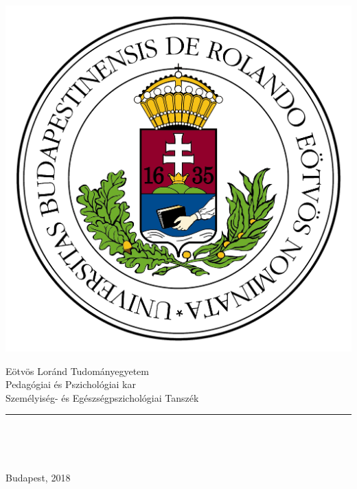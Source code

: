 \begin{titlepage}

\begin{minipage}{0.40\linewidth}
\includegraphics[scale=0.3]{images/elte_logo}
\end{minipage}
\begin{minipage}{0.50\linewidth}
\begin{center}
Eötvös Loránd Tudományegyetem \\
Pedagógiai és Pszichológiai kar \\
Személyiség- és Egészségpszichológiai Tanszék
\end{center}
\end{minipage}

\hrule
\vfill

\begin{center}
\Huge
\textbf{\Title}
\normalsize
\end{center}

\begin{center}
	\Large
	\textbf{\SubTitle}
	\normalsize
\end{center}

\vfill

\begin{minipage}[t]{0.45\linewidth}
\begin{flushleft}
\textbf{\SupervisorName} \\
\SupervisorTitle
\end{flushleft}
\end{minipage}
\begin{minipage}[t]{0.5\linewidth}
\begin{flushright}
\textbf{\Author} \\
\AuthortTitle
\end{flushright}
\end{minipage}

\vfill

\begin{center}
Budapest, 2018
\end{center}

\end{titlepage}
